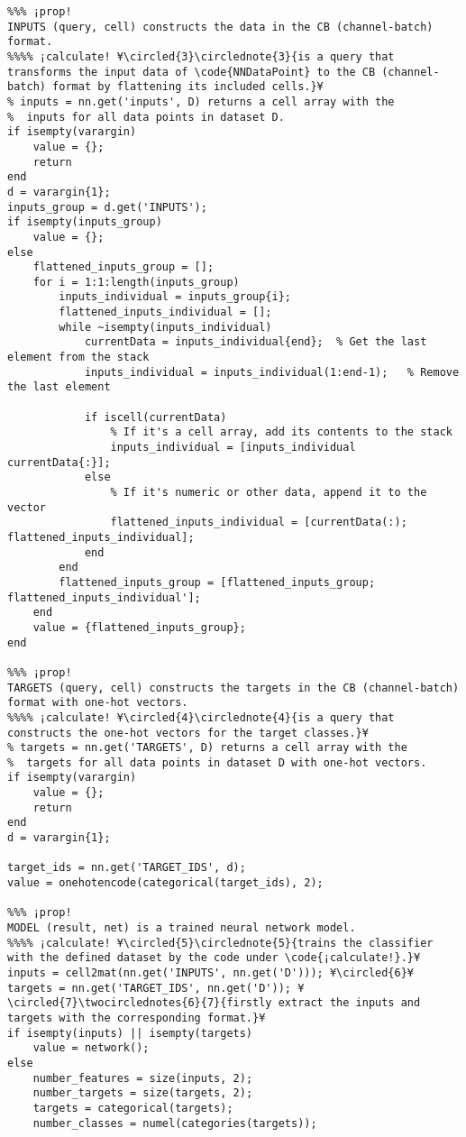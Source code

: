 \documentclass{tufte-handout}
\begin{document}
\begin{lstlisting}
%%% ¡prop!
INPUTS (query, cell) constructs the data in the CB (channel-batch) format.
%%%% ¡calculate! ¥\circled{3}\circlednote{3}{is a query that transforms the input data of \code{NNDataPoint} to the CB (channel-batch) format by flattening its included cells.}¥
% inputs = nn.get('inputs', D) returns a cell array with the
%  inputs for all data points in dataset D.
if isempty(varargin)
    value = {};
    return
end
d = varargin{1};
inputs_group = d.get('INPUTS');
if isempty(inputs_group)
    value = {};
else
    flattened_inputs_group = [];
    for i = 1:1:length(inputs_group)
        inputs_individual = inputs_group{i};
        flattened_inputs_individual = [];
        while ~isempty(inputs_individual)
            currentData = inputs_individual{end};  % Get the last element from the stack
            inputs_individual = inputs_individual(1:end-1);   % Remove the last element

            if iscell(currentData)
                % If it's a cell array, add its contents to the stack
                inputs_individual = [inputs_individual currentData{:}];
            else
                % If it's numeric or other data, append it to the vector
                flattened_inputs_individual = [currentData(:); flattened_inputs_individual];
            end
        end
        flattened_inputs_group = [flattened_inputs_group; flattened_inputs_individual'];
    end
    value = {flattened_inputs_group};
end

%%% ¡prop!
TARGETS (query, cell) constructs the targets in the CB (channel-batch) format with one-hot vectors.
%%%% ¡calculate! ¥\circled{4}\circlednote{4}{is a query that constructs the one-hot vectors for the target classes.}¥
% targets = nn.get('TARGETS', D) returns a cell array with the
%  targets for all data points in dataset D with one-hot vectors.
if isempty(varargin)
    value = {};
    return
end
d = varargin{1};

target_ids = nn.get('TARGET_IDS', d);
value = onehotencode(categorical(target_ids), 2);

%%% ¡prop!
MODEL (result, net) is a trained neural network model.
%%%% ¡calculate! ¥\circled{5}\circlednote{5}{trains the classifier with the defined dataset by the code under \code{¡calculate!}.}¥
inputs = cell2mat(nn.get('INPUTS', nn.get('D'))); ¥\circled{6}¥
targets = nn.get('TARGET_IDS', nn.get('D')); ¥\circled{7}\twocirclednotes{6}{7}{firstly extract the inputs and targets with the corresponding format.}¥
if isempty(inputs) || isempty(targets)
    value = network();
else
    number_features = size(inputs, 2);
    number_targets = size(targets, 2);
    targets = categorical(targets); 
    number_classes = numel(categories(targets));
    

\end{lstlisting}
\end{document}
